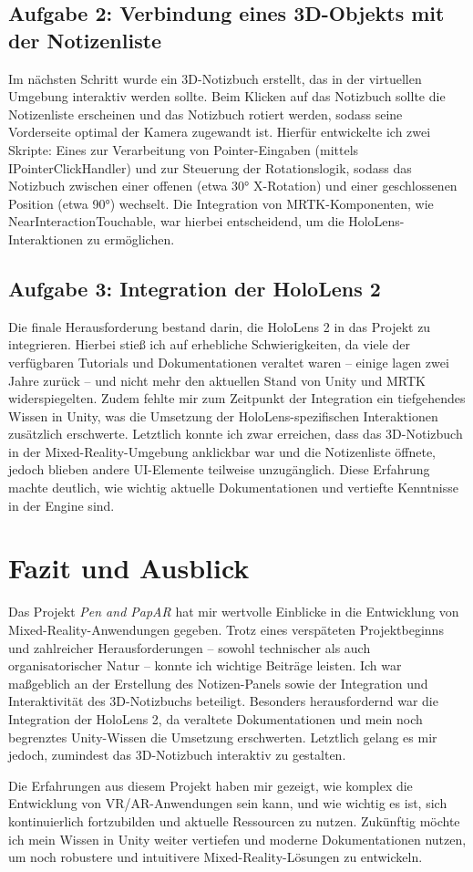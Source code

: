 \documentclass[11pt]{article}
\begin{document}
\subsection{Aufgabe 2: Verbindung eines 3D-Objekts mit der Notizenliste}
Im nächsten Schritt wurde ein 3D-Notizbuch erstellt, das in der virtuellen Umgebung interaktiv werden sollte. Beim Klicken auf das Notizbuch sollte die Notizenliste erscheinen und das Notizbuch rotiert werden, sodass seine Vorderseite optimal der Kamera zugewandt ist. Hierfür entwickelte ich zwei Skripte: Eines zur Verarbeitung von Pointer-Eingaben (mittels IPointerClickHandler) und zur Steuerung der Rotationslogik, sodass das Notizbuch zwischen einer offenen (etwa 30° X-Rotation) und einer geschlossenen Position (etwa 90°) wechselt. Die Integration von MRTK-Komponenten, wie NearInteractionTouchable, war hierbei entscheidend, um die HoloLens-Interaktionen zu ermöglichen.

\subsection{Aufgabe 3: Integration der HoloLens 2}
Die finale Herausforderung bestand darin, die HoloLens 2 in das Projekt zu integrieren. Hierbei stieß ich auf erhebliche Schwierigkeiten, da viele der verfügbaren Tutorials und Dokumentationen veraltet waren – einige lagen zwei Jahre zurück – und nicht mehr den aktuellen Stand von Unity und MRTK widerspiegelten. Zudem fehlte mir zum Zeitpunkt der Integration ein tiefgehendes Wissen in Unity, was die Umsetzung der HoloLens-spezifischen Interaktionen zusätzlich erschwerte. Letztlich konnte ich zwar erreichen, dass das 3D-Notizbuch in der Mixed-Reality-Umgebung anklickbar war und die Notizenliste öffnete, jedoch blieben andere UI-Elemente teilweise unzugänglich. Diese Erfahrung machte deutlich, wie wichtig aktuelle Dokumentationen und vertiefte Kenntnisse in der Engine sind.

\section{Fazit und Ausblick}\label{sec:fazit}
Das Projekt \textit{Pen and PapAR} hat mir wertvolle Einblicke in die Entwicklung von Mixed-Reality-Anwendungen gegeben. Trotz eines verspäteten Projektbeginns und zahlreicher Herausforderungen – sowohl technischer als auch organisatorischer Natur – konnte ich wichtige Beiträge leisten. Ich war maßgeblich an der Erstellung des Notizen-Panels sowie der Integration und Interaktivität des 3D-Notizbuchs beteiligt. Besonders herausfordernd war die Integration der HoloLens 2, da veraltete Dokumentationen und mein noch begrenztes Unity-Wissen die Umsetzung erschwerten. Letztlich gelang es mir jedoch, zumindest das 3D-Notizbuch interaktiv zu gestalten.

Die Erfahrungen aus diesem Projekt haben mir gezeigt, wie komplex die Entwicklung von VR/AR-Anwendungen sein kann, und wie wichtig es ist, sich kontinuierlich fortzubilden und aktuelle Ressourcen zu nutzen. Zukünftig möchte ich mein Wissen in Unity weiter vertiefen und moderne Dokumentationen nutzen, um noch robustere und intuitivere Mixed-Reality-Lösungen zu entwickeln.
\end{document}
